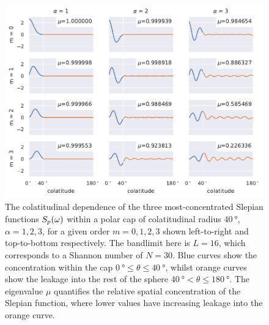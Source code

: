 \begin{figure}[htpb]
	\centering\capstart{}
	\includegraphics[width=\textwidth]{slepian_colatitude.pdf}
	\caption[
		The colatitudinal dependence of the polar cap Slepian functions
	]{
		The colatitudinal dependence of the three most-concentrated Slepian functions \({S}_{p}(\omega)\) within a polar cap of colatitudinal radius \(\SI{40}{\degree}\), \ie{} \(\alpha=1,2,3\), for a given order \(m=0,1,2,3\) shown left-to-right and top-to-bottom respectively.
		The bandlimit here is  \(L=16\), which corresponds to a Shannon number of \(N=30\).
		Blue curves show the concentration within the cap \(\SI{0}{\degree} \leq \theta \leq \SI{40}{\degree}\), whilst orange curves show the leakage into the rest of the sphere \(\SI{40}{\degree} < \theta \leq \SI{180}{\degree}\).
		The eigenvalue \(\mu{}\) quantifies the relative spatial concentration of the Slepian function, where lower values have increasing leakage into the orange curve.
	}\label{fig:chapter2_slepian_colatitude}
\end{figure}
